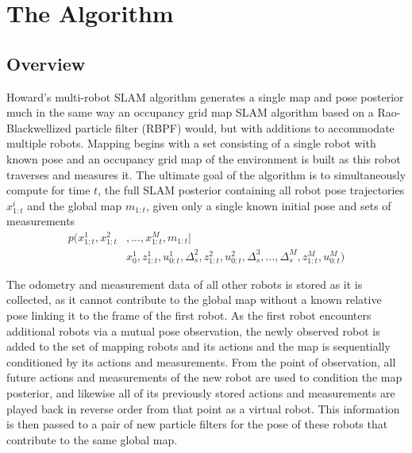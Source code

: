 \section{The Algorithm}
\label{S:Alg}

\subsection{Overview}
\label{SS:Alg:Overview} 


Howard's multi-robot SLAM algorithm generates a single map and pose posterior much in the same way an occupancy grid map SLAM algorithm based on a Rao-Blackwellized particle filter (RBPF) would, but with additions to accommodate multiple robots. Mapping begins with a set consisting of a single robot with known pose and an occupancy grid map of the environment is built as this robot traverses and measures it. The ultimate goal of the algorithm is to simultaneously compute for time $t$, the full SLAM posterior containing all robot pose trajectories $x_{1:t}^i$ and the global map $m_{1:t}$, given only a single known initial pose and sets of measurements
\begin{align*}
p(x_{1:t}^1,x_{1:t}^2&,...,x_{1:t}^M,m_{1:t}|\\&x_0^1,z_{1:t}^1,u_{0:t}^1,\Delta_s^2,z_{1:t}^2,u_{0:t}^2,\Delta_s^3,...,\Delta_s^M,z_{1:t}^M,u_{0:t}^M)
\end{align*}

The odometry and measurement data of all other robots is stored as it is collected, as it cannot contribute to the global map without a known relative pose linking it to the frame of the first robot. As the first robot encounters additional robots via a mutual pose observation, the newly observed robot is added to the set of mapping robots and its actions and the map is sequentially conditioned by its actions and measurements. From the point of observation, all future actions and measurements of the new robot are used to condition the map posterior, and likewise all of its previously stored actions and measurements are played back in reverse order from that point as a virtual robot. This information is then passed to a pair of new particle filters for the pose of these robots that contribute to the same global map. 

